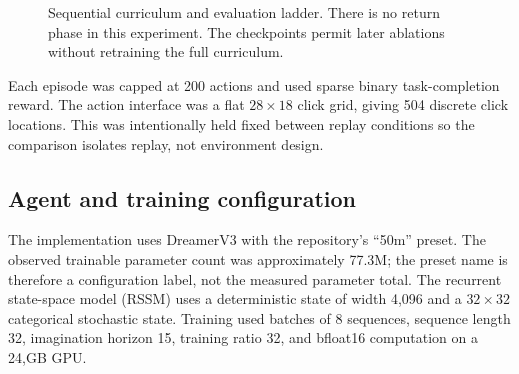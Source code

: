 \documentclass[10pt]{article}
\begin{document}
\begin{figure}[H]
\centering
{}
\caption{Sequential curriculum and evaluation ladder. There is no return phase in this experiment. The checkpoints permit later ablations without retraining the full curriculum.}
\label{fig:timeline}
\end{figure}

Each episode was capped at 200 actions and used sparse binary task-completion reward. The action interface was a flat $28\times18$ click grid, giving 504 discrete click locations. This was intentionally held fixed between replay conditions so the comparison isolates replay, not environment design.

\subsection{Agent and training configuration}

The implementation uses DreamerV3 \citep{hafner2023dreamerv3} with the repository's ``50m'' preset. The observed trainable parameter count was approximately 77.3M; the preset name is therefore a configuration label, not the measured parameter total. The recurrent state-space model (RSSM) uses a deterministic state of width 4,096 and a $32\times32$ categorical stochastic state. Training used batches of 8 sequences, sequence length 32, imagination horizon 15, training ratio 32, and bfloat16 computation on a 24,GB GPU.
\end{document}
